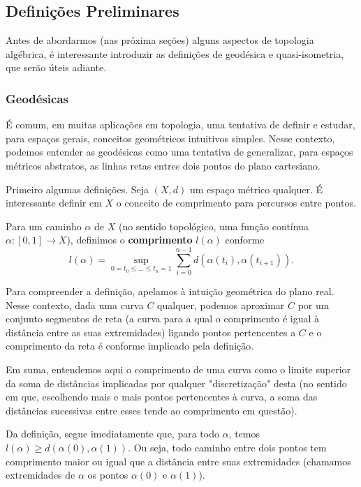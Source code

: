 \subsection{Definições Preliminares}
Antes de abordarmos (nas próxima seções) alguns aspectos de topologia algébrica, é interessante introduzir as definições de geodésica e quasi-isometria, que serão úteis adiante.

\subsubsection{Geodésicas}
É comum, em muitas aplicações em topologia, uma tentativa de definir e estudar, para espaços gerais, conceitos geométricos intuitivos simples. Nesse contexto, podemos entender as geodésicas como uma tentativa de generalizar, para espaços métricos abstratos, as linhas retas entres dois pontos do plano cartesiano.

Primeiro algumas definições. Seja $(X, d)$ um espaço métrico qualquer. É interessante definir em $X$ o conceito de comprimento para percursos entre pontos.

\begin{definition}
Para um caminho $\alpha$ de $X$ (no sentido topológico, uma função contínua $\alpha : [0,1] \rightarrow X$), definimos o \textbf{comprimento} $l(\alpha)$ conforme
\[
l(\alpha) = \sup_{0=t_0 \leq ... \leq t_n = 1} \sum_{i=0}^{n-1}  d(\alpha(t_i), \alpha(t_{i+1})).
\]
\end{definition}

Para compreender a definição, apelamos à intuição geométrica do plano real. Nesse contexto, dada uma curva $C$ qualquer, podemos aproximar $C$ por um conjunto segmentos de reta (a curva para a qual o comprimento é igual à distância entre as suas extremidades) ligando pontos pertencentes a $C$ e o comprimento da reta é conforme implicado pela definição.

Em suma, entendemos aqui o comprimento de uma curva como o limite superior da soma de distâncias implicadas por qualquer "discretização" desta (no sentido em que, escolhendo mais e mais pontos pertencentes à curva, a soma das distâncias sucessivas entre esses tende ao comprimento em questão).

Da definição, segue imediatamente que, para todo $\alpha$, temos $l(\alpha) \geq d(\alpha(0), \alpha(1))$. Ou seja, todo caminho entre dois pontos tem comprimento maior ou igual que a distância entre suas extremidades (chamamos extremidades de $\alpha$ os pontos $\alpha(0)$ e $\alpha(1)$).

